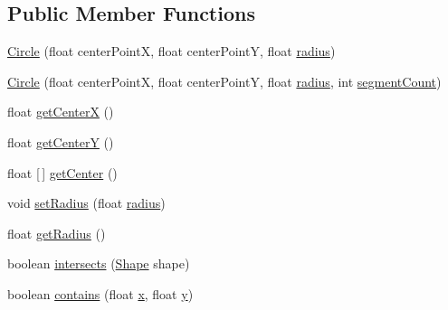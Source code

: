 \subsection*{Public Member Functions}
\begin{DoxyCompactItemize}
\item 
\mbox{\hyperlink{classorg_1_1newdawn_1_1slick_1_1geom_1_1_circle_a4cdb3cb7dcabd983bfaa2ec623333e5a}{Circle}} (float center\+PointX, float center\+PointY, float \mbox{\hyperlink{classorg_1_1newdawn_1_1slick_1_1geom_1_1_circle_a4ca88ec1c6b329912a60e4dd02ccdf5a}{radius}})
\item 
\mbox{\hyperlink{classorg_1_1newdawn_1_1slick_1_1geom_1_1_circle_aef27ba7d6550d458ed3ad7978b5aedc6}{Circle}} (float center\+PointX, float center\+PointY, float \mbox{\hyperlink{classorg_1_1newdawn_1_1slick_1_1geom_1_1_circle_a4ca88ec1c6b329912a60e4dd02ccdf5a}{radius}}, int \mbox{\hyperlink{classorg_1_1newdawn_1_1slick_1_1geom_1_1_ellipse_a08f529daee51987987eda5f422abdd31}{segment\+Count}})
\item 
float \mbox{\hyperlink{classorg_1_1newdawn_1_1slick_1_1geom_1_1_circle_a54401470f8ee5f99c2013ca06e7cb057}{get\+CenterX}} ()
\item 
float \mbox{\hyperlink{classorg_1_1newdawn_1_1slick_1_1geom_1_1_circle_a3e64722eb886a7936ce75199e94e1e48}{get\+CenterY}} ()
\item 
float \mbox{[}$\,$\mbox{]} \mbox{\hyperlink{classorg_1_1newdawn_1_1slick_1_1geom_1_1_circle_a8a20aea1b64846598f0b641518261721}{get\+Center}} ()
\item 
void \mbox{\hyperlink{classorg_1_1newdawn_1_1slick_1_1geom_1_1_circle_aa62c5ac4b04e9a252a0d462724231d98}{set\+Radius}} (float \mbox{\hyperlink{classorg_1_1newdawn_1_1slick_1_1geom_1_1_circle_a4ca88ec1c6b329912a60e4dd02ccdf5a}{radius}})
\item 
float \mbox{\hyperlink{classorg_1_1newdawn_1_1slick_1_1geom_1_1_circle_a3d83f7477c608a767ced2622440a528a}{get\+Radius}} ()
\item 
boolean \mbox{\hyperlink{classorg_1_1newdawn_1_1slick_1_1geom_1_1_circle_a43871352a37b105ea470981d89a178cc}{intersects}} (\mbox{\hyperlink{classorg_1_1newdawn_1_1slick_1_1geom_1_1_shape}{Shape}} shape)
\item 
boolean \mbox{\hyperlink{classorg_1_1newdawn_1_1slick_1_1geom_1_1_circle_aaab616d4b6e3009c427c96126f25aeb2}{contains}} (float \mbox{\hyperlink{classorg_1_1newdawn_1_1slick_1_1geom_1_1_shape_a3e985bfff386c15a4efaad03d8ad60d3}{x}}, float \mbox{\hyperlink{classorg_1_1newdawn_1_1slick_1_1geom_1_1_shape_a9f934baded6a1b65ebb69e7e5f80ea00}{y}})
\end{DoxyCompactItemize}
